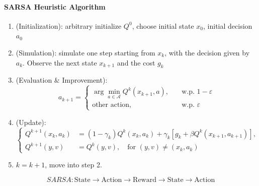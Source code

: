 \paragraph{SARSA Heuristic Algorithm}
\begin{enumerate}
\item
(Initialization): arbitrary initialize $Q^0$, choose initial state $x_0$, initial decision $a_0$
\item
(Simulation): simulate one step starting from $x_k$, with the decision given by $a_k$. Observe the next state $x_{k+1}$ and the cost $g_k$
\item
(Evaluation $\&$ Improvement):
\[
a_{k+1}
=
\left\{
\begin{aligned}
\arg\min_{a\in\mathcal{A}}Q^k(x_{k+1},a),&\quad \text{w.p. }1-\varepsilon\\
\text{other action},&\quad \text{w.p. }\varepsilon
\end{aligned}
\right.
\]
\item
(Update):
\[
\left\{
\begin{aligned}
Q^{k+1}(x_k,a_k)&=(1-\gamma_k)Q^k(x_k,a_k)+\gamma_k\left[g_k+\beta Q^k(x_{k+1},a_{k+1})\right],\\
Q^{k+1}(y,v)&=Q^k(y,v),\quad \text{for }(y,v)\ne(x_k,a_k)
\end{aligned}
\right.
\]
\item
$k=k+1$, move into step 2.
\end{enumerate}
\[
SARSA: \text{State}\to\text{Action}\to\text{Reward}\to\text{State}\to\text{Action}
\]













%
%







